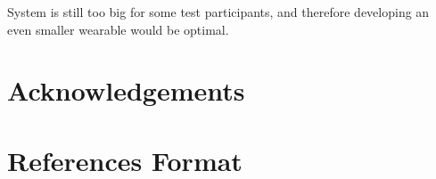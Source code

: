 \documentclass{sigchi}
\begin{document}
System is still too big for some test participants, and therefore developing an even smaller wearable would be optimal. 

\section{Acknowledgements}

%
%
%
%
%
\balance{}

\section{References Format} 

\cite{kaye:puc}







\end{document}

